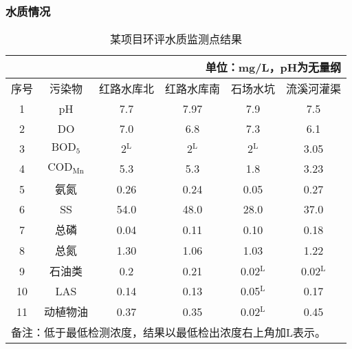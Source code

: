 \subsubsection{水质情况}
\begin{table}[H]
    \centering
    \caption{某项目环评水质监测点结果}
    \begin{tabular}{cccccc}
        \multicolumn{6}{r}{单位：mg/L，pH为无量纲} \\
        \toprule
        序号    & 污染物   & 红路水库北 & 红路水库南 & 石场水坑  & 流溪河灌渠 \\
        \midrule
        1     & pH    & 7.7   & 7.97  & 7.9   & 7.5 \\
        2     & DO    & 7.0     & 6.8   & 7.3   & 6.1 \\
        3     & $\mathrm{BOD_5}$  & 2$^{\mathrm{L}}$    & 2$^{\mathrm{L}}$     & 2$^{\mathrm{L}}$    & 3.05 \\
        4     & $\mathrm{COD_{Mn}}$ & 5.3   & 5.3   & 1.8   & 3.23 \\
        5     & 氨氮    & 0.26  & 0.24  & 0.05  & 0.27 \\
        6     & SS    & 54.0    & 48.0    & 28.0    & 37.0 \\
        7     & 总磷    & 0.04  & 0.11  & 0.10   & 0.18 \\
        8     & 总氮    & 1.30   & 1.06  & 1.03  & 1.22 \\
        9     & 石油类   & 0.2   & 0.21  & 0.02$^{\mathrm{L}}$ & 0.02$^{\mathrm{L}}$ \\
        10    & LAS   & 0.14  & 0.13  & 0.05$^{\mathrm{L}}$ & 0.17 \\
        11    & 动植物油  & 0.37  & 0.35  & 0.02$^{\mathrm{L}}$ & 0.45 \\
        \bottomrule
        \multicolumn{6}{l}{备注：低于最低检测浓度，结果以最低检出浓度右上角加L表示。} \\
    \end{tabular}%
    \label{tab:Results of water quality monitoring points for environmental impact assessment of a project}%
\end{table}%


